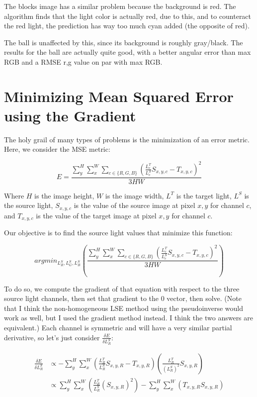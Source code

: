 \documentclass{article}
\begin{document}
The blocks image has a similar problem because the background is red. The 
algorithm finds that the light color is actually red, due to this, and to 
counteract the red light, the prediction has way too much cyan added (the 
opposite of red).

The ball is unaffected by this, since its background is roughly gray/black. The 
results for the ball are actually quite good, with a better angular error than 
max RGB and a RMSE r,g value on par with max RGB.

\section{Minimizing Mean Squared Error using the Gradient}

The holy grail of many types of problems is the minimization of an error metric. 
Here, we consider the MSE metric:

$$
E = \frac{\sum^H_y \sum^W_x \sum_{c \in \{R, G, B\}} (\frac{L^T_c}{L^S_c} S_{x,y,c} - T_{x,y,c})^2}{3 H W}
$$

Where $H$ is the image height, $W$ is the image width, $L^T$ is the target 
light, $L^S$ is the source light, $S_{x,y,c}$ is the value of the source image at pixel 
$x, y$ for channel $c$, and $T_{x,y,c}$ is the value of the target image at pixel $x, y$ for 
channel $c$.

Our objective is to find the source light values that minimize this function:

$$
argmin_{L^S_R, L^S_G, L^S_B} (\frac{\sum^H_y \sum^W_x \sum_{c \in \{R, G, B\}} (\frac{L^T_c}{L^S_c} S_{x,y,c} - T_{x,y,c})^2}{3 H W})
$$

To do so, we compute the gradient of that equation with respect to the three 
source light channels, then set that gradient to the 0 vector, then solve. (Note 
that I think the non-homogeneous LSE method using the pseudoinverse would work 
as well, but I used the gradient method instead. I think the two answers are 
equivalent.) Each 
channel is symmetric and will have a very similar partial derivative, so let's 
just consider $\frac{\delta E}{\delta L^S_R}$:

\begin{align*}
\frac{\delta E}{\delta L^S_R} &\propto - \sum^H_y \sum^W_x (\frac{L^T_R}{L^S_R} S_{x,y,R} - T_{x,y,R}) (\frac{L^T_R}{(L^S_R)^2} S_{x,y,R}) \\
                              &\propto \sum^H_y \sum^W_x (\frac{L^T_R}{L^S_R} (S_{x,y,R})^2) - \sum^H_y \sum^W_x (T_{x,y,R} S_{x,y,R})
\end{align*}
\end{document}
